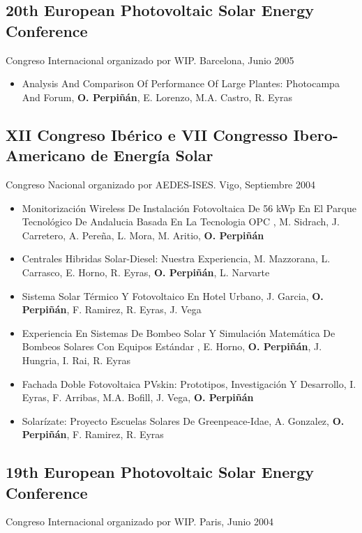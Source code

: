 \documentclass[article, a4paper]{memoir}
\begin{document}
\subsection{20th European Photovoltaic Solar Energy Conference}
\label{sec-9-10}
Congreso Internacional organizado por WIP. Barcelona, Junio 2005

\begin{itemize}
\item Analysis And Comparison Of Performance Of Large Plantes: Photocampa And Forum, \textbf{O. Perpiñán}, E. Lorenzo, M.A. Castro, R. Eyras
\end{itemize}

\subsection{XII Congreso Ibérico e VII Congresso Ibero-Americano de Energía Solar}
\label{sec-9-11}
Congreso Nacional organizado por AEDES-ISES. Vigo, Septiembre 2004

\begin{itemize}
\item Monitorización Wireless De Instalación Fotovoltaica De 56 kWp En El Parque Tecnológico De Andalucia Basada En La Tecnologia OPC , M. Sidrach, J. Carretero, A. Pereña, L. Mora, M. Aritio, \textbf{O. Perpiñán}

\item Centrales Hibridas Solar-Diesel: Nuestra Experiencia, M. Mazzorana, L. Carrasco, E. Horno, R. Eyras, \textbf{O. Perpiñán}, L.  Narvarte

\item Sistema Solar Térmico Y Fotovoltaico En Hotel Urbano, J. Garcia, \textbf{O. Perpiñán}, F. Ramirez, R. Eyras, J. Vega

\item Experiencia En Sistemas De Bombeo Solar Y Simulación Matemática De Bombeos Solares Con Equipos Estándar , E. Horno, \textbf{O. Perpiñán}, J. Hungria, I. Rai, R. Eyras

\item Fachada Doble Fotovoltaica PVskin: Prototipos, Investigación Y Desarrollo, I. Eyras, F. Arribas, M.A. Bofill, J. Vega, \textbf{O. Perpiñán}

\item Solarízate: Proyecto Escuelas Solares De Greenpeace-Idae, A. Gonzalez, \textbf{O. Perpiñán}, F. Ramirez, R. Eyras
\end{itemize}

\subsection{19th European Photovoltaic Solar Energy Conference}
\label{sec-9-12}
Congreso Internacional organizado por WIP. Paris, Junio 2004
\end{document}
